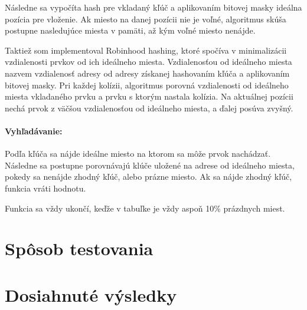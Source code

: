 \documentclass[a4paper,slovak,12pt]{article}
\begin{document}
    Následne sa vypočíta hash pre vkladaný kľúč a aplikovaním bitovej masky ideálna pozícia pre vloženie.
    Ak miesto na danej pozícii nie je voľné, algoritmus skúša postupne nasledujúce miesta v pamäti, až kým voľné miesto nenájde.

    Taktiež som implementoval Robinhood hashing, ktoré spočíva v minimalizácii vzdialenosti prvkov od ich ideálneho miesta.
    Vzdialenosťou od ideálneho miesta nazvem vzdialenosť adresy od adresy získanej hashovaním kľúča a aplikovaním bitovej masky.
    Pri každej kolízii, algoritmus porovná vzdialenosti od ideálneho miesta vkladaného prvku a prvku s ktorým nastala kolízia.
    Na aktuálnej pozícii nechá prvok z väčšou vzdialenosťou od ideálneho miesta, a ďalej posúva zvyšný.

    \paragraph{Vyhľadávanie:}
    Podľa kľúča sa nájde ideálne miesto na ktorom sa môže prvok nachádzať.
    Následne sa postupne porovnávajú klúče uložené na adrese od ideálneho miesta, pokedy sa nenájde zhodný kľúč, alebo prázne miesto.
    Ak sa nájde zhodný kľúč, funkcia vráti hodnotu.

    Funkcia sa vždy ukončí, keďže v tabuľke je vždy aspoň 10\% prázdnych miest.

    \section{Spôsob testovania}\label{sec:sposob-testovania}




    \section{Dosiahnuté výsledky}\label{sec:dosiahnute-vysledky}
\end{document}
